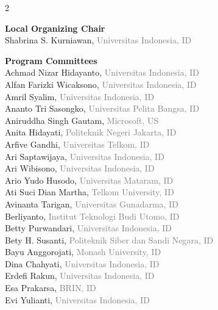 \documentclass[10pt,a4paper]{article}
\begin{document}
\begin{multicols}{2}
\begin{minipage}{\linewidth}
\textbf{\color{conf}Local Organizing Chair}\\
Shabrina S. Kurniawan, \textcolor{gray}{Universitas Indonesia, ID}\\
\end{minipage}
\vspace{0.8em}

\begin{minipage}{\linewidth}
\textbf{\color{conf}Program Committees}\\
Achmad Nizar Hidayanto, \textcolor{gray}{Universitas Indonesia, ID}\\
Alfan Farizki Wicaksono, \textcolor{gray}{Universitas Indonesia, ID}\\
Amril Syalim, \textcolor{gray}{Universitas Indonesia, ID}\\
Ananto Tri Sasongko, \textcolor{gray}{Universitas Pelita Bangsa, ID}\\
Aniruddha Singh Gautam, \textcolor{gray}{Microsoft, US}\\
Anita Hidayati, \textcolor{gray}{Politeknik Negeri Jakarta, ID}\\
Arfive Gandhi, \textcolor{gray}{Universitas Telkom, ID}\\
Ari Saptawijaya, \textcolor{gray}{Universitas Indonesia, ID}\\
Ari Wibisono, \textcolor{gray}{Universitas Indonesia, ID}\\
Ario Yudo Husodo, \textcolor{gray}{Universitas Mataram, ID}\\
Ati Suci Dian Martha, \textcolor{gray}{Telkom University, ID}\\
Avinanta Tarigan, \textcolor{gray}{Universitas Gunadarma, ID}\\
Berliyanto, \textcolor{gray}{Institut Teknologi Budi Utomo, ID}\\
Betty Purwandari, \textcolor{gray}{Universitas Indonesia, ID}\\
Bety H. Susanti, \textcolor{gray}{Politeknik Siber dan Sandi Negara, ID}\\
Bayu Anggorojati, \textcolor{gray}{Monash University, ID}\\
Dina Chahyati, \textcolor{gray}{Universitas Indonesia, ID}\\
Erdefi Rakun, \textcolor{gray}{Universitas Indonesia, ID}\\
Esa Prakarsa, \textcolor{gray}{BRIN, ID}\\
Evi Yulianti, \textcolor{gray}{Universitas Indonesia, ID}\\

\end{minipage}
\end{multicols}
\end{document}
